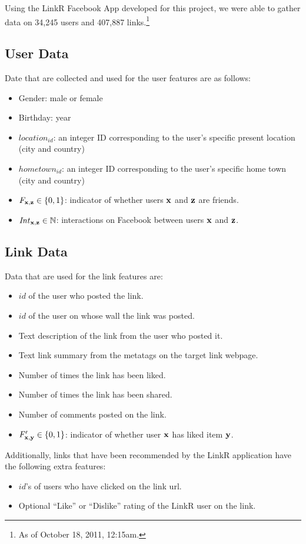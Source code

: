 \label{sec:dataset}

Using the LinkR Facebook App developed for this project, we were able
to gather data on 34,245 users and 407,887 links.\footnote{As of
October 18, 2011, 12:15am.}

\subsection{User Data}

Date that are collected and used for the user features are as follows:
\begin{itemize}
\item {Gender:} male or female
\item {Birthday:} year
\item {$\mathit{location}_\mathit{id}$:} an integer ID corresponding
to the user's specific present location (city and country)
\item {$\mathit{hometown}_\mathit{id}$:} an integer ID corresponding
to the user's specific home town (city and country)
\item {$F_{\mathbf{x},\mathbf{z}} \in \{ 0, 1\}$:} indicator of whether 
users $\mathbf{x}$ and $\mathbf{z}$ are friends.
\item {$\mathit{Int}_{\mathbf{x},\mathbf{z}} \in \mathbb{N}$:} interactions on
Facebook between users $\mathbf{x}$ and $\mathbf{z}$.
\end{itemize}

\subsection{Link Data}

Data that are used for the link features are:
\begin{itemize}
\item{$\mathit{id}$ of the user who posted the link.}
\item{$\mathit{id}$ of the user on whose wall the link was posted.}
\item{Text description of the link from the user who posted it.}
\item{Text link summary from the metatags on the target link webpage.}
\item{Number of times the link has been liked.}
\item{Number of times the link has been shared.}
\item{Number of comments posted on the link}.
\item {$F'_{\mathbf{x},\mathbf{y}} \in \{0, 1\}$:} indicator of whether user $\mathbf{x}$ has liked item $\mathbf{y}$.
\end{itemize}
Additionally, links that have been recommended by the LinkR
application have the following extra features:
\begin{itemize}
\item{$\mathit{id}$'s of users who have clicked on the link url.}
\item{Optional ``Like'' or ``Dislike'' rating of the LinkR user on the link.}
\end{itemize}

